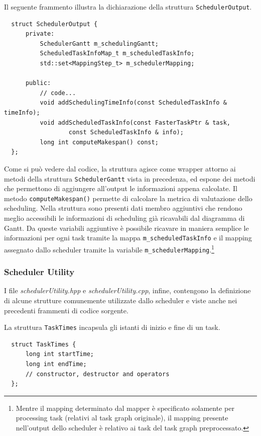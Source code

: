 Il seguente frammento illustra la dichiarazione della struttura \verb+SchedulerOutput+.
\newline
\begin{verbatim}
  struct SchedulerOutput {
      private:
          SchedulerGantt m_schedulingGantt;
          ScheduledTaskInfoMap_t m_scheduledTaskInfo;
          std::set<MappingStep_t> m_schedulerMapping;

      public:
          // code...
          void addSchedulingTimeInfo(const ScheduledTaskInfo & timeInfo);
          void addScheduledTaskInfo(const FasterTaskPtr & task,
                  const ScheduledTaskInfo & info);
          long int computeMakespan() const;
  };
\end{verbatim}
Come si può vedere dal codice, la struttura agisce come wrapper attorno ai 
metodi della struttura \verb+SchedulerGantt+ vista in precedenza, ed espone dei 
metodi che permettono di aggiungere all'output le informazioni appena calcolate.
Il metodo \verb+computeMakespan()+ permette di calcolare la metrica di valutazione
dello scheduling. Nella struttura sono presenti dati membro aggiuntivi che rendono
meglio accessibili le informazioni di scheduling già ricavabili dal diagramma di Gantt.
Da queste variabili aggiuntive è possibile ricavare in maniera semplice le informazioni
per ogni task tramite la mappa \verb+m_scheduledTaskInfo+ e il mapping assegnato dallo
scheduler tramite la variabile \verb+m_schedulerMapping+.\footnote{Mentre il mapping
determinato dal mapper è specificato solamente per processing task (relativi al task 
graph originale), il mapping presente nell'output dello scheduler è relativo ai 
task del task graph preprocessato.}

\subsubsection{Scheduler Utility}
I file \emph{schedulerUtility.hpp} e \emph{schedulerUtility.cpp}, infine, 
contengono la definizione di alcune strutture comunemente utilizzate dallo 
scheduler e viste anche nei precedenti frammenti di codice sorgente.

La struttura \verb+TaskTimes+ incapsula gli istanti di inizio e fine di un task.
\newline
\begin{verbatim}
  struct TaskTimes {
      long int startTime;
      long int endTime;
      // constructor, destructor and operators
  };
\end{verbatim}

